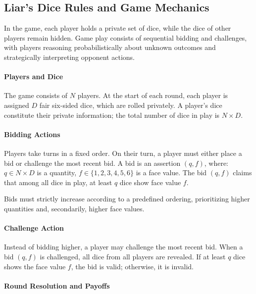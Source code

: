 \appendix

\subsection{Liar’s Dice Rules and Game Mechanics}
\label{app:rules}

In the game, each player holds a private set of dice, while the dice of other players remain hidden. Game play consists of sequential bidding and challenges, with players reasoning probabilistically about unknown outcomes and strategically interpreting opponent actions.

\paragraph{\textbf{Players and Dice}}

The game consists of $N$ players. At the start of each round, each player is assigned $D$ fair six-sided dice, which are rolled privately. A player’s dice constitute their private information; the total number of dice in play is $N \times D$.

\paragraph{\textbf{Bidding Actions}}

Players take turns in a fixed order. On their turn, a player must either place a bid or challenge the most recent bid. A bid is an assertion $(q, f)$, where: $q \in N \times D$ is a quantity, $f \in \{1,2,3,4,5,6\}$ is a face value. The bid $(q, f)$ claims that among all dice in play, at least $q$ dice show face value $f$.

Bids must strictly increase according to a predefined ordering, prioritizing higher quantities and, secondarily, higher face values.

\paragraph{\textbf{Challenge Action}}

Instead of bidding higher, a player may challenge the most recent bid. When a bid $(q, f)$ is challenged, all dice from all players are revealed. If at least $q$ dice shows the face value $f$, the bid is valid; otherwise, it is invalid.

\paragraph{\textbf{Round Resolution and Payoffs}}

